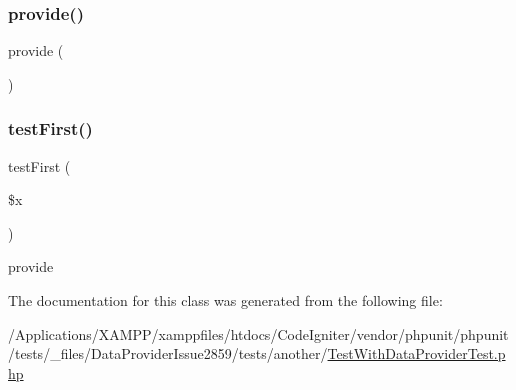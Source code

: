 \subsubsection{\texorpdfstring{provide()}{provide()}}
{\footnotesize\ttfamily provide (\begin{DoxyParamCaption}{ }\end{DoxyParamCaption})}

\mbox{\label{class_foo_1_1_data_provider_issue2859_1_1_test_with_data_provider_test_af8ab67a72789da589982c3966d8642ef}} 
\subsubsection{\texorpdfstring{test\+First()}{testFirst()}}
{\footnotesize\ttfamily test\+First (\begin{DoxyParamCaption}\item[{}]{\$x }\end{DoxyParamCaption})}

provide 

The documentation for this class was generated from the following file\+:\begin{DoxyCompactItemize}
\item 
/\+Applications/\+X\+A\+M\+P\+P/xamppfiles/htdocs/\+Code\+Igniter/vendor/phpunit/phpunit/tests/\+\_\+files/\+Data\+Provider\+Issue2859/tests/another/\mbox{\hyperlink{_test_with_data_provider_test_8php}{Test\+With\+Data\+Provider\+Test.\+php}}\end{DoxyCompactItemize}
